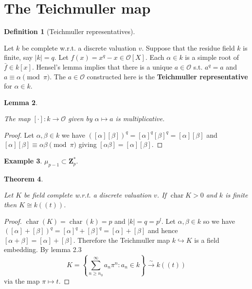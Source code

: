 \documentclass[10pt,]{book}
\newcommand{\gt}{>}
\newcommand{\terminology}[1]{\textbf{#1}}
\theoremstyle{plain}
\newtheorem{theorem}{Theorem}[section]
\newtheorem{lemma}[theorem]{Lemma}
\theoremstyle{definition}
\newtheorem{definition}[theorem]{Definition}
\newtheorem{example}[theorem]{Example}
\newcommand{\ZZ}{\mathbf{Z}}
\newcommand{\cO}{\mathcal{O}}
\DeclareMathOperator{\chara}{char}
\begin{document}
\section[The Teichmuller map]{The Teichmuller map}\label{sec-teichmuller}
\begin{definition}[Teichmuller representatives]\label{definition-8}

            Let \(k\) be complete w.r.t. a discrete valuation \(v\).
            Suppose that the residue field \(k\) is finite, say \(|k| = q\).
            Let \(f(x) = x^q - x \in \cO[X]\).
            Each \(\alpha \in k\) is a simple root of \(\bar f \in k[x]\).
            Hensel's lemma implies that there is a unique \(a \in\cO\) s.t. \(a^q = a\) and \(a \equiv \alpha \pmod{\pi}\).
            The \(a \in \cO\) constructed here is the \terminology{Teichmuller representative} for \(\alpha \in k\).
          \end{definition}
\begin{lemma}\label{lemma-12}

            The map \([\cdot]\colon k \to \cO\) given by \(\alpha \mapsto a\) is multiplicative.
          \end{lemma}
\begin{proof}

            Let \(\alpha,\beta \in k\) we have \(([\alpha][\beta])^q = [\alpha]^q[\beta]^q = [\alpha][\beta]\) and \([\alpha][\beta] \equiv \alpha\beta \pmod{\pi}\) giving \([\alpha\beta]  =[\alpha][\beta]\).
          \end{proof}
\begin{example}\label{example-7}
\(\mu_{p-1} \subset \ZZ_p^*\).
          \end{example}
\begin{theorem}\label{theorem-2}

            Let \(K\) be field complete w.r.t. a discrete valuation \(v\).
            If \(\chara K \gt 0\) and \(k\) is finite then \(K \cong k((t))\).
          \end{theorem}
\begin{proof}
\(\chara(K) = \chara(k) = p\) and \(|k| = q = p^l\).
            Let \(\alpha,\beta \in k\) so we have \(([\alpha] + [\beta])^q = [\alpha]^q + [\beta]^q = [\alpha] + [\beta]\) and hence \([\alpha + \beta] = [\alpha] + [\beta]\).
            Therefore the Teichmuller map \(k \hookrightarrow K\) is a field embedding.
            By lemma 2.3 \[K = \left\{ \sum_{n \ge n_0}^\infty a_n \pi^n : a_n \in k\right\}\xrightarrow{\sim} k((t))\]
            via the map \(\pi \mapsto t\).
          \end{proof}
\typeout{************************************************}
\typeout{************************************************}
\end{document}
